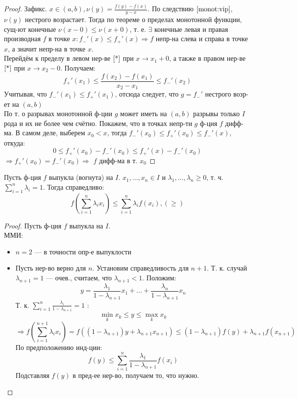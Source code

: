 \begin{proof}
Зафикс. $x \in (a, b), \nu(y) = \frac{f(y) - f(x)}{y - x}$. По следствию $\ref{monot:vip}$, $\nu(y)$ нестрого возрастает. Тогда по теореме о пределах монотонной функции, сущ-ют конечные $\nu(x - 0) \leq \nu(x + 0)$, т. е. $\exists$ конечные левая и правая производная  $f$ в точке $x\colon f_-'(x) \leq f_+'(x) \Rightarrow f$ непр-на слева и справа в точке $x$, а значит непр-на в точке $x$. \\

Перейдём к пределу в левом нер-ве $\ref{*}$ при $x \rightarrow x_1 + 0$, а также в правом нер-ве $\ref{*}$ при $x \rightarrow x_2 - 0$. Получаем:
\[
f_+'(x_1) \leq \frac{f(x_2) - f(x_1)}{x_2 - x_1} \leq f_-'(x_2)
\]
Учитывая, что $f_-'(x_1) \leq f_+'(x_1)$, отсюда следует, что $g = f_-'$ нестрого возр-ет на $(a, b)$ \\

По т. о разрывах монотонной ф-ции $g$ может иметь на $(a, b)$ разрывы только $I$ рода и их не более чем счётно. Покажем, что в точках непр-ти $g$ ф-ция $f$ дифф-ма. В самом деле, выберем $x_0 < x$, тогда $f_-'(x_0) \leq f_+'(x_0) \leq f_-'(x)$, откуда:
\[
0 \leq f_+'(x_0) - f_-'(x_0) \leq f_+'(x) - f_-'(x_0)
\]
$\Rightarrow f_+'(x_0) = f_-'(x_0) \Rightarrow $ $f$ дифф-ма в т. $x_0$
\end{proof}
\begin{theorem}
\label{18}
Пусть ф-ция $f$ выпукла (вогнута) на $I$. $x_1, \ldots, x_n \in I$ и $\lambda_1, \ldots, \lambda_n \geq 0$, т. ч. $\sum_{i = 1}^{n} \lambda_i = 1$. Тогда справедливо:
\[
f\left(\sum_{i = 1}^{n} \lambda_i x_i\right) \leq \sum_{i = 1}^{n} \lambda_i f(x_i), (\geq)
\]
\end{theorem}
\begin{proof}
Пусть ф-ция $f$ выпукла на $I$.\\
ММИ:
\begin{itemize}
  \item $n = 2$ --- в точности опр-е выпуклости
\item Пусть нер-во верно для $n$. Установим справедливость для $n + 1$. Т. к. случай $\lambda_{n + 1} = 1$ --- очев., считаем, что $\lambda_{n + 1} < 1$. Положим:
  \[
  y = \frac{\lambda_1}{1 - \lambda_{n + 1}} x_1 + \ldots + \frac{\lambda_n}{1 - \lambda_{n + 1}} x_n
  \]
  Т. к. $\sum_{i = 1}^{n} \frac{\lambda_i}{1 - \lambda_{n + 1}} = 1$ :
  \[
    \underset{k}{\min} x_k \leq y \leq \underset{k}{\max} x_k
  \]
  \[
  \Rightarrow f\left(\sum_{i = 1}^{n + 1} \lambda_i x_i\right) = f\left((1 - \lambda_{n + 1})y + \lambda_{n + 1}x_{n + 1}\right) \leq (1 - \lambda_{n + 1})f(y) + \lambda_{n + 1}f(x_{n + 1})
  \]
  По предположению инд-ции:
  \[
  f(y) \leq \sum_{i = 1}^{n} \frac{\lambda_1}{1 - \lambda_{n + 1}} f(x_i)
  \]
  Подставляя $f(y)$ в пред-ее нер-во, получаем то, что нужно.
\end{itemize}
\end{proof}
